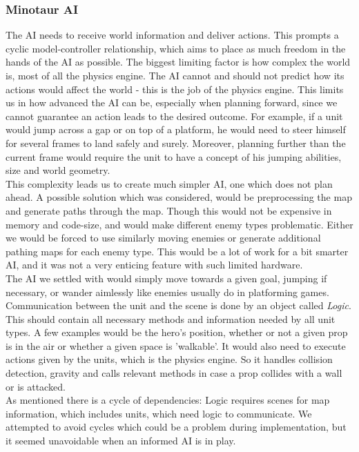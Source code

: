 \subsubsection{Minotaur AI} %
The AI needs to receive world information and deliver actions. This prompts a cyclic model-controller relationship, which aims to place as much freedom in the hands of the AI as possible. The biggest limiting factor is how complex the world is, most of all the physics engine. The AI cannot and should not predict how its actions would affect the world - this is the job of the physics engine. This limits us in how advanced the AI can be, especially when planning forward, since we cannot guarantee an action leads to the desired outcome. For example, if a unit would jump across a gap or on top of a platform, he would need to steer himself for several frames to land safely and surely. Moreover, planning further than the current frame would require the unit to have a concept of his jumping abilities, size and world geometry.\\
This complexity leads us to create much simpler AI, one which does not plan ahead. A possible solution which was considered, would be preprocessing the map and generate paths through the map. Though this would not be expensive in memory and code-size, and would make different enemy types problematic. Either we would be forced to use similarly moving enemies or generate additional pathing maps for each enemy type. This would be a lot of work for a bit smarter AI, and it was not a very enticing feature with such limited hardware.\\
The AI we settled with would simply move towards a given goal, jumping if necessary, or wander aimlessly like enemies usually do in platforming games.\\
Communication between the unit and the scene is done by an object called \emph{Logic}. This should contain all necessary methods and information needed by all unit types. A few examples would be the hero's position, whether or not a given prop is in the air or whether a given space is 'walkable'. It would also need to execute actions given by the units, which is the physics engine. So it handles collision detection, gravity and calls relevant methods in case a prop collides with a wall or is attacked.\\
As mentioned there is a cycle of dependencies: Logic requires scenes for map information, which includes units, which need logic to communicate. We attempted to avoid cycles which could be a problem during implementation, but it seemed unavoidable when an informed AI is in play.

